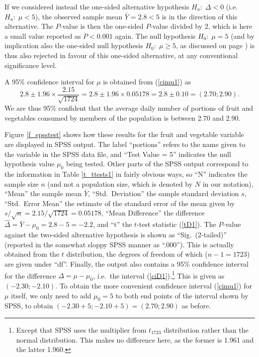 If we considered instead the one-sided alternative hypothesis $H_{a}:\;
\Delta<0$ (i.e.\ $H_{a}: \; \mu<5$), the observed sample mean
$\bar{Y}=2.8<5$ is in the direction of this alternative. The $P$-value
is then the one-sided $P$-value divided by 2, which is here a small value
reported as $P<0.001$ again. The null hypothesis $H_{0}: \; \mu=5$ (and
by implication also the one-sided null hypothesis $H_{0}:\; \mu\ge 5$,
as discussed on page \pageref{p_onesidednull}) is thus also rejected in
favour of this one-sided alternative, at any conventional significance
level.

A 95\% confidence interval for
$\mu$ is obtained from (\ref{cimu1}) as
\[
2.8\pm 1.96 \times \frac{2.15}{\sqrt{1724}}
=2.8\pm 1.96 \times 0.05178=
2.8\pm 0.10 = (2.70; 2.90).
\]
We are thus 95\% confident that the average daily number of portions of
fruit and vegetables consumed by members of the population is between
2.70 and 2.90.

Figure \ref{f_spsstest} shows how these results for the fruit and
vegetable variable are displayed in SPSS output. The label ``portions''
refers to the name given to the variable in the SPSS data file,
and ``Test Value = 5'' indicates the null
hypothesis value $\mu_{0}$ being tested.
\label{p_ttest_expl}Other parts of the SPSS output correspond to the
information in Table \ref{t_ttests1} in fairly obvious ways, so ``N''
indicates the sample size $n$ (and not a population size, which is
denoted by $N$ in our notation), ``Mean'' the sample mean $\bar{Y}$,
``Std.\ Deviation'' the sample standard deviation $s$, ``Std.\ Error
Mean'' the estimate of the standard error of the mean given by
$s/\sqrt{n}=2.15/\sqrt{1724}=0.05178$, ``Mean Difference'' the
difference $\hat{\Delta}=\bar{Y}-\mu_{0}=2.8-5=-2.2$, and ``t'' the
$t$-test statistic (\ref{tD1}). The $P$-value against the two-sided
alternative hypothesis is shown as ``Sig.\ (2-tailed)'' (reported in the
somewhat sloppy SPSS manner as ``.000''). This is actually obtained from
the $t$ distribution, the degrees of freedom of which ($n-1=1723$) are
given under ``df''. Finally, the output also contains a 95\% confidence
interval for the difference $\Delta=\mu-\mu_{0}$, i.e.\ the interval
(\ref{ciD1}).\footnote{ Except that SPSS uses the multiplier from
$t_{1723}$
distribution rather than the normal distribution. This makes no
difference here, as the former is 1.961 and the latter 1.960.} This is
given as $(-2.30; -2.10)$. To obtain the more convenient confidence
interval
(\ref{cimu1}) for $\mu$ itself, we only need to add $\mu_{0}=5$ to both
end points of the interval shown by SPSS, to obtain $(-2.30+5;
-2.10+5)=(2.70; 2.90)$ as before.

